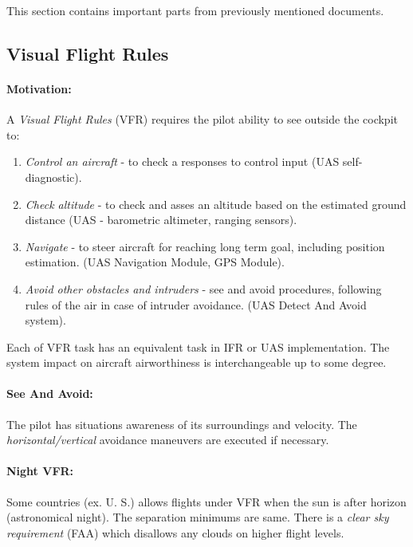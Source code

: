 \begin{note}
    This section contains important parts from previously mentioned documents. 
\end{note}

\subsection{Visual Flight Rules}\label{sec:VisualFlightRules}
\paragraph{Motivation:} A \emph{Visual Flight Rules} (VFR) requires the pilot ability to see outside the cockpit to:

\begin{enumerate}
    \item \emph{Control an aircraft} - to check a responses to control input (UAS self-diagnostic).
    
    \item \emph{Check altitude} - to check and asses an altitude based on the estimated ground distance (UAS - barometric altimeter, ranging sensors).
    
    \item \emph{Navigate} - to steer aircraft for reaching long term goal, including position estimation. (UAS Navigation Module, GPS Module).
    
    \item \emph{Avoid other obstacles and intruders} - see and avoid procedures, following rules of the air in case of intruder avoidance. (UAS Detect And Avoid system).
\end{enumerate}

\begin{note}
    Each of VFR task has an equivalent task in IFR or UAS implementation. The system impact on aircraft airworthiness is interchangeable up to some degree.
\end{note}

\paragraph{See And Avoid:} The pilot has situations awareness of its surroundings and velocity. The \emph{horizontal/vertical} avoidance maneuvers are executed if necessary. 

\paragraph{Night VFR:} Some countries (ex. U. S.) allows flights under VFR when the sun is after horizon (astronomical night). The separation minimums are same. There is a \emph{clear sky requirement} (FAA) which disallows any clouds on higher flight levels.



